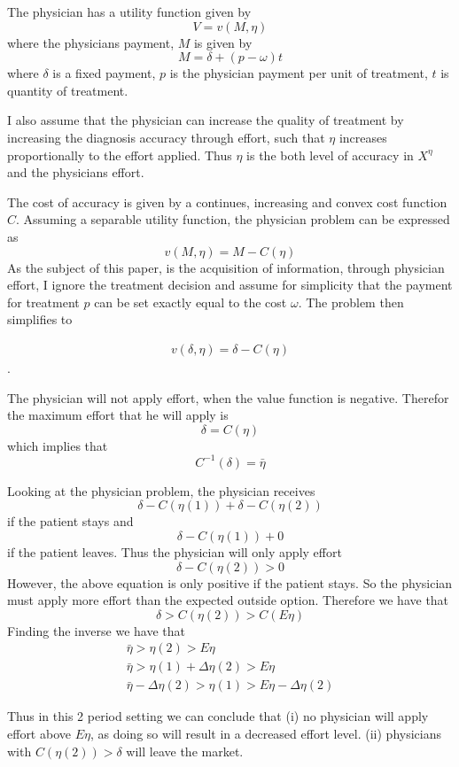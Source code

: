 The physician has a utility function given by
\[
    V=v(M,\eta)
\]
where the physicians payment, $M$ is given by
\[
    M=\delta+(p-\omega)t 
\]
where $\delta$ is a fixed payment, $p$ is the physician payment per unit of treatment, $t$ is quantity of treatment.

 I also assume that the physician can increase the quality of treatment by increasing the diagnosis accuracy through effort, such that $\eta$ increases proportionally to the effort applied. Thus $\eta$ is the both level of accuracy in $X^\eta$ and the physicians effort. 

 The cost of accuracy is given by a continues, increasing and convex cost function $C$. Assuming a separable utility function, the physician problem can be expressed as
\[
    v(M,\eta)=M-C(\eta)
\]
As the subject of this paper, is the acquisition of information, through physician effort, I ignore the treatment decision and assume for simplicity that the payment for treatment $p$ can be set exactly equal to the cost $\omega$.  The problem then simplifies to

\begin{align}
    v(\delta,\eta)=\delta-C(\eta)\label{eq:phys-utility}
\end{align}.

The physician will not apply effort, when the value function is negative. Therefor the maximum effort that he will apply is 
\[
    \delta=C(\eta)
\]
which implies that 
\[
    C^{-1}(\delta)=\bar{\eta}
\]

 Looking at the physician problem, the physician receives 
 \[
     \delta-C(\eta(1))+\delta-C(\eta(2))
 \]
 if the patient stays and 
 \[
     \delta-C(\eta(1))+0
 \]
 if the patient leaves. Thus the physician will only apply effort  
 \[
     \delta-C(\eta(2))>0
 \]
 However, the above equation is only positive if the patient stays. So the physician must apply more effort than the expected outside option. Therefore we have that 
 \[
     \delta>C(\eta(2))>C(E\eta)
 \]
 Finding the inverse we have that 
\begin{align*}
    \bar{\eta}>\eta(2)>E\eta \\
    \bar{\eta}>\eta(1)+\Delta\eta(2)>E\eta \\
    \bar{\eta}-\Delta\eta(2)>\eta(1)>E\eta-\Delta\eta(2) 
\end{align*}
 
 Thus in this 2 period setting we can conclude that (i) no physician will apply effort above $E\eta$, as doing so will result in a decreased effort level. (ii) physicians with $C(\eta(2))>\delta$ will leave the market. 

